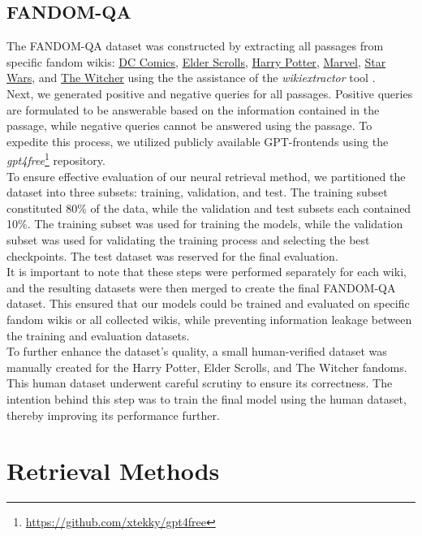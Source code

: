\documentclass[11pt]{article}
\begin{document}
\subsection{FANDOM-QA}
The FANDOM-QA dataset was constructed by extracting all passages from specific fandom wikis: \href{https://dc.fandom.com}{DC Comics}, \href{https://elderscrolls.fandom.com}{Elder Scrolls}, \href{https://harrypotter.fandom.com}{Harry Potter}, \href{https://marvel.fandom.com}{Marvel}, \href{https://starwars.fandom.com}{Star Wars}, and \href{https://witcher.fandom.com}{The Witcher} using the the assistance of the \textit{wikiextractor} tool \cite{Wikiextractor2015}. \\
Next, we generated positive and negative queries for all passages. Positive queries are formulated to be answerable based on the information contained in the passage, while negative queries cannot be answered using the passage. To expedite this process, we utilized publicly available GPT-frontends using the \textit{gpt4free}\footnote{\url{https://github.com/xtekky/gpt4free}} repository. \\
To ensure effective evaluation of our neural retrieval method, we partitioned the dataset into three subsets: training, validation, and test. The training subset constituted 80\% of the data, while the validation and test subsets each contained 10\%. The training subset was used for training the models, while the validation subset was used for validating the training process and selecting the best checkpoints. The test dataset was reserved for the final evaluation. \\
It is important to note that these steps were performed separately for each wiki, and the resulting datasets were then merged to create the final FANDOM-QA dataset. This ensured that our models could be trained and evaluated on specific fandom wikis or all collected wikis, while preventing information leakage between the training and evaluation datasets.\\
To further enhance the dataset's quality, a small human-verified dataset was manually created for the Harry Potter, Elder Scrolls, and The Witcher fandoms. This human dataset underwent careful scrutiny to ensure its correctness. The intention behind this step was to train the final model using the human dataset, thereby improving its performance further.\\



\section{Retrieval Methods}
\end{document}
